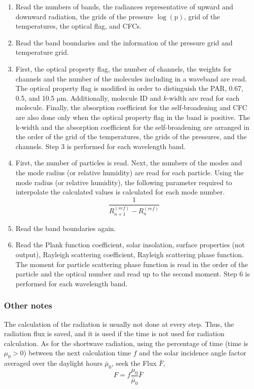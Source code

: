 \begin{enumerate}
\def\labelenumi{\arabic{enumi}.}
\item
  Read the numbers of bands, the radiances representative of upward and
  downward radiation, the grids of the pressure \(\log (\mathrm{p})\),
  grid of the temperatures, the optical flag, and CFCs.
\item
  Read the band boundaries and the information of the pressure grid and
  temperature grid.
\item
  First, the optical property flag, the number of channels, the weights
  for channels and the number of the molecules including in a waveband
  are read. The optical property flag is modified in order to
  distinguish the PAR, 0.67, 0.5, and 10.5 \(\mathrm{{\mu}m}\).
  Additionally, molecule ID and \(k\)-width are read for each molecule.
  Finally, the absorption coefficient for the self-broadening and CFC
  are also done only when the optical property flag in the band is
  positive. The k-width and the absorption coefficient for the
  self-broadening are arranged in the order of the grid of the
  temperatures, the grids of the pressures, and the channels. Step 3 is
  performed for each wavelength band.
\item
  First, the number of particles is read. Next, the numbers of the modes
  and the mode radius (or relative humidity) are read for each particle.
  Using the mode radius (or relative humidity), the following parameter
  required to interpolate the calculated values is calculated for each
  mode number. \begin{equation}
  \frac{1}{R_{n+1}^{(r e f)}-R_{n}^{(r e f)}}
  \end{equation}
\item
  Read the band boundaries again.
\item
  Read the Plank function coefficient, solar insolation, surface
  properties (not output), Rayleigh scattering coefficient, Rayleigh
  scattering phase function. The moment for particle scattering phase
  function is read in the order of the particle and the optical number
  and read up to the second moment. Step 6 is performed for each
  wavelength band.
\end{enumerate}

\hypertarget{other-notes}{%
\subsubsection{Other notes}\label{other-notes}}

The calculation of the radiation is usually not done at every step.
Thus, the radiation flux is saved, and it is used if the time is not
used for radiation calculation. As for the shortwave radiation, using
the percentage of time (time is \(\mu_{0}>0\)) between the next
calculation time \(f\) and the solar incidence angle factor averaged
over the daylight hours \(\bar{\mu}_{0}\), seek the Flux \(\bar{F}\), \begin{equation}
{F}=f \frac{\mu_{0}}{\bar{\mu}_{0}} \bar{F}
\end{equation}

